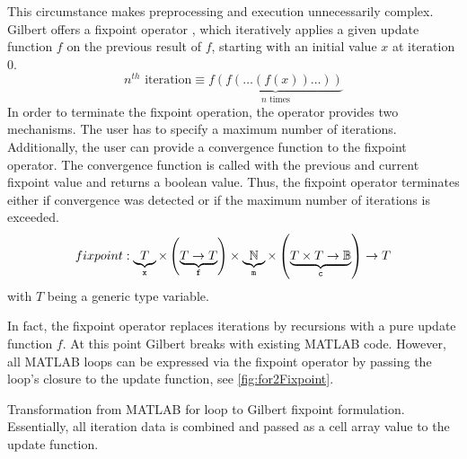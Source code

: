 This circumstance makes preprocessing and execution unnecessarily complex. 
Gilbert offers a fixpoint operator , which iteratively applies a given update function $f$ on the previous result of $f$, starting with an initial value $x$ at iteration $0$.
\begin{displaymath}
  n^{th}\text{ iteration}\equiv\underbrace{f(f(\ldots(f(x))\ldots))}_{\text{$n$ times}}
\end{displaymath}
In order to terminate the fixpoint operation, the operator provides two mechanisms.
The user has to specify a maximum number  of iterations.
Additionally, the user can provide a convergence function  to the fixpoint operator.
The convergence function is called with the previous and current fixpoint value and returns a boolean value.
Thus, the fixpoint operator terminates either if convergence was detected or if the maximum number of iterations is exceeded.
\begin{equation}
\label{eq:fixpoint}
fixpoint: \underbrace{T}_{\text{\texttt{x}}} \times \left( \underbrace{T \rightarrow T}_{\text{\texttt{f}}} \right) \times \underbrace{\mathbb{N}}_{\text{\texttt{m}}} \times \left(\underbrace{T\times T \rightarrow \mathbb{B}}_{\text{\texttt{c}}} \right) \rightarrow T
\end{equation}
with $T$ being a generic type variable.

In fact, the fixpoint operator replaces iterations by recursions with a pure update function $f$. 
At this point Gilbert breaks with existing MATLAB code. 
However, all MATLAB loops can be expressed via the fixpoint operator by passing the loop's closure to the update function, see \cref{fig:for2Fixpoint}.
\begin{listing}
  \centering
  \caption{Transformation from MATLAB for loop  to Gilbert fixpoint  formulation. Essentially, all iteration data is combined and passed as a cell array value to the update function.}
  \label{fig:for2Fixpoint}
\end{listing}

